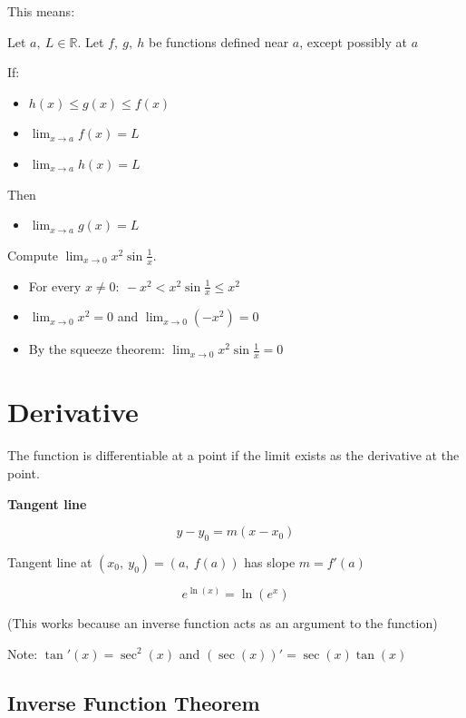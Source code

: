 \documentclass[12pt]{article}
\theoremstyle{plain}
\theoremstyle{remark}
\theoremstyle{definition}
\begin{document}
This means:

Let \(a,\ L\mathbb{\in R}\). Let \(f,\ g,\ h\) be functions defined near
\(a\), except possibly at \(a\)

If:

\begin{itemize}
\item
  \(h(x) \leq g(x) \leq f(x)\)
\item
  \(\lim_{x \rightarrow a}{f(x)} = L\)
\item
  \(\lim_{x \rightarrow a}{h(x)} = L\)
\end{itemize}

Then

\begin{itemize}
\item
  \(\lim_{x \rightarrow a}{g(x)} = L\)
\end{itemize}

Compute \(\lim_{x \rightarrow 0}{x^{2}\sin\frac{1}{x}}\).

\begin{itemize}
\item
  For every \(x \neq 0:\  - x^{2} < x^{2}\sin\frac{1}{x} \leq x^{2}\)
\item
  \(\lim_{x \rightarrow 0}x^{2} = 0\) and
  \(\lim_{x \rightarrow 0}{( - x^{2})} = 0\)
\item
  By the squeeze theorem:
  \(\lim_{x \rightarrow 0}{x^{2}\sin\frac{1}{x} = 0}\)
\end{itemize}


\section{Derivative}

The function is differentiable at a point if the limit exists as the
derivative at the point.

\textbf{Tangent line}

\[y - y_{0} = m\left( x - x_{0} \right)\]

Tangent line at
\(\left( x_{0},\ y_{0} \right) = \left( a,\ f(a) \right)\) has slope
\(m = f'(a)\)

\[e^{\ln(x)} = \ln\left( e^{x} \right)\]

(This works because an inverse function acts as an argument to the
function)

Note: \(\tan'(x) = \sec^{2}(x)\) and
\(\left( \sec(x) \right)' = \sec(x)\tan(x)\)


\subsection{Inverse Function Theorem}
\end{document}

